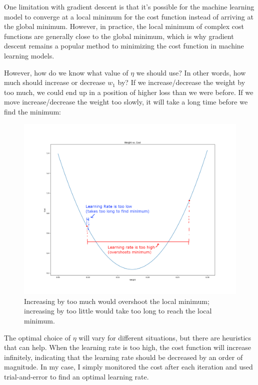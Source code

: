 \documentclass[12pt]{article}
\begin{document}
One limitation with gradient descent is that it's possible for the machine learning model to converge at a local minimum for the cost function instead of arriving at the global minimum. However, in practice, the local minimum of complex cost functions are generally close to the global minimum, which is why gradient descent remains a popular method to minimizing the cost function in machine learning models.

However, how do we know what value of $\eta$ we should use? In other words, how much should increase or decrease $w_1$ by? If we increase/decrease the weight by too much, we could end up in a position of higher loss than we were before. If we move increase/decrease the weight too slowly, it will take a long time before we find the minimum:

\begin{figure}[H]
	\centering
	\caption{Increasing by too much would overshoot the local minimum; increasing by too little would take too long to reach the local minimum.}
	\includegraphics[width=\linewidth]{learning-rate.png}
\end{figure}

The optimal choice of $\eta$ will vary for different situations, but there are heuristics that can help. When the learning rate is too high, the cost function will increase infinitely, indicating that the learning rate should be decreased by an order of magnitude. In my case, I simply monitored the cost after each iteration and used trial-and-error to find an optimal learning rate.
\end{document}
